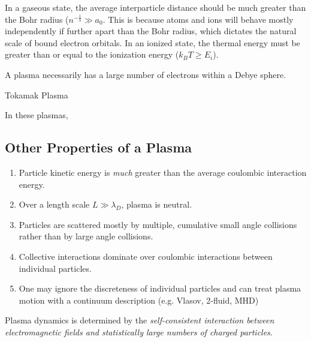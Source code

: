 In a gaseous state, the average interparticle distance should be much greater than the Bohr radius ($n^{-\frac{1}{3}} \gg a_0$. This is because atoms and ions will behave mostly independently if further apart than the Bohr radius, which dictates the natural scale of bound electron orbitals. In an ionized state, the thermal energy must be greater than or equal to the ionization energy ($k_BT \geq E_i$).

\begin{prop}
  A plasma necessarily has a large number of electrons within a Debye sphere.
\end{prop}

\begin{eg}
  Tokamak Plasma
\end{eg}
\begin{explanation}
  In these plasmas, 
\end{explanation}

\subsection{Other Properties of a Plasma}
\begin{enumerate}
  \item Particle kinetic energy is \textit{much} greater than the average coulombic interaction energy.
  \item Over a length scale $L \gg \lambda_D$, plasma is neutral.
  \item Particles are scattered mostly by multiple, cumulative small angle collisions rather than by large angle collisions.
  \item Collective interactions dominate over coulombic interactions between individual particles.
  \item One may ignore the discreteness of individual particles and can treat plasma motion with a continuum description (e.g. Vlasov, 2-fluid, MHD)
\end{enumerate}

\begin{definition}
  Plasma dynamics is determined by the \textit{self-consistent interaction between electromagnetic fields and statistically large numbers of charged particles}.
\end{definition}
